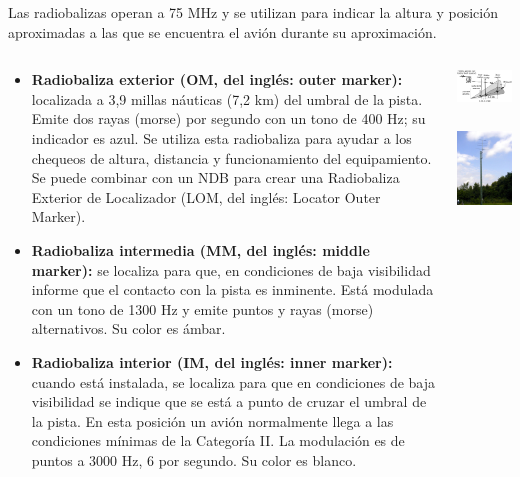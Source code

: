 \documentclass[10pt]{beamer}
\begin{document}
\begin{frame}
Las radiobalizas operan a 75 MHz y se utilizan para indicar la altura y posición aproximadas a las que se encuentra el avión durante su aproximación.


  \begin{columns}
    \begin{column}{0.5\textwidth}{\tiny
 \begin{itemize}
      \item {\bf Radiobaliza exterior (OM, del inglés: outer marker):} localizada a 3,9 millas náuticas (7,2 km) del umbral de la pista. Emite dos rayas (morse) por segundo con un tono de 400 Hz; su indicador es azul. Se utiliza esta radiobaliza para ayudar a los chequeos de altura, distancia y funcionamiento del equipamiento. Se puede combinar con un NDB para crear una Radiobaliza Exterior de Localizador (LOM, del inglés: Locator Outer Marker).
	 \item \textbf{Radiobaliza intermedia (MM, del inglés: middle marker): }se localiza para que, en condiciones de baja visibilidad informe que el contacto con la pista es inminente. Está modulada con un tono de 1300 Hz y emite puntos y rayas (morse) alternativos. Su color es ámbar.
	 \item \textbf{Radiobaliza interior (IM, del inglés: inner marker):} cuando está instalada, se localiza para que en condiciones de baja visibilidad se indique que se está a punto de cruzar el umbral de la pista. En esta posición un avión normalmente llega a las condiciones mínimas de la Categoría II. La modulación es de puntos a 3000 Hz, 6 por segundo. Su color es blanco.
    \end{itemize}
}
    \end{column}
    \begin{column}{0.5\textwidth}
    \includegraphics[width=\textwidth]{imagenes/markers.gif}

    \includegraphics[height=2.5cm]{imagenes/antena-radiobaliza.eps}
  \end{column}

  \end{columns}

\end{frame}
\end{document}
